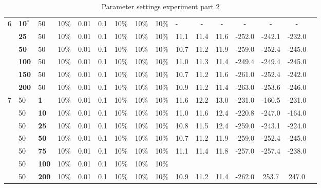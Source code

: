 \begin{sidewaystable}
\begin{tabular}{|l|l|l|l|l|l|l|l|l|l||c|c|c|c|c|c|}
    \hline
    6 & \textbf{10$^*$} & 50 & 10\% & 0.01 & 0.1 & 10\% & 10\% & 10\% & - & - & - & - & - & - \\
    ~ & \textbf{25} & 50 & 10\% & 0.01 & 0.1 & 10\% & 10\% & 10\% & 11.1 & 11.4 & 11.6 & -252.0 & -242.1 & -232.0 \\
    ~ & \textbf{50} & 50 & 10\% & 0.01 & 0.1 & 10\% & 10\% & 10\% & 10.7 & 11.2 & 11.9 & -259.0 & -252.4 & -245.0 \\
    ~ & \textbf{100} & 50 & 10\% & 0.01 & 0.1 & 10\% & 10\% & 10\% & 11.0 & 11.3 & 11.4 & -249.4 & -249.4 & -245.0 \\
    ~ & \textbf{150} & 50 & 10\% & 0.01 & 0.1 & 10\% & 10\% & 10\% & 10.7 & 11.2 & 11.6 & -261.0 & -252.4 & -242.0 \\
    ~ & \textbf{200} & 50 & 10\% & 0.01 & 0.1 & 10\% & 10\% & 10\% & 10.9 & 11.2 & 11.4 & -263.0 & -253.6 & -246.0 \\
    \hline
    7 & 50 & \textbf{1} & 10\% & 0.01 & 0.1 & 10\% & 10\% & 10\% & 11.6 & 12.2 & 13.0 & -231.0 & -160.5 & -231.0  \\
    ~ & 50 & \textbf{10} & 10\% & 0.01 & 0.1 & 10\% & 10\% & 10\% & 11.0 & 11.6 & 12.4 & -220.8 & -247.0 & -164.0  \\
    ~ & 50 & \textbf{25} & 10\% & 0.01 & 0.1 & 10\% & 10\% & 10\% & 10.8 & 11.5 & 12.4 & -259.0 & -243.1 & -224.0  \\
    ~ & 50 & \textbf{50} & 10\% & 0.01 & 0.1 & 10\% & 10\% & 10\% & 10.7 & 11.2 & 11.9 & -259.0 & -252.4 & -245.0 \\
    ~ & 50 & \textbf{75} & 10\% & 0.01 & 0.1 & 10\% & 10\% & 10\% & 11.1 & 11.4 & 11.8 & -257.0 & -257.4 & -238.0  \\
    ~ & 50 & \textbf{100} & 10\% & 0.01 & 0.1 & 10\% & 10\% & 10\% & ~ & ~ & ~ & ~ & ~ & ~  \\
    ~ & 50 & \textbf{200} & 10\% & 0.01 & 0.1 & 10\% & 10\% & 10\% & 10.9 & 11.2 & 11.4 & -262.0 & 253.7 & 247.0  \\
    \hline
    \end{tabular}
    \caption {Parameter settings experiment part 2}
    \label{table:pm2}
\end{sidewaystable}


